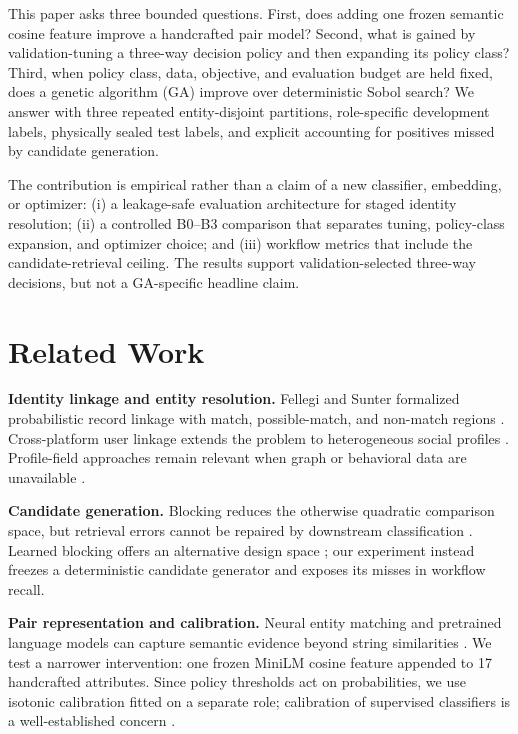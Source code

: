 \documentclass[conference]{IEEEtran}
\begin{document}
This paper asks three bounded questions. First, does adding one frozen semantic cosine feature improve a handcrafted pair model? Second, what is gained by validation-tuning a three-way decision policy and then expanding its policy class? Third, when policy class, data, objective, and evaluation budget are held fixed, does a genetic algorithm (GA) improve over deterministic Sobol search? We answer with three repeated entity-disjoint partitions, role-specific development labels, physically sealed test labels, and explicit accounting for positives missed by candidate generation.

The contribution is empirical rather than a claim of a new classifier, embedding, or optimizer: (i) a leakage-safe evaluation architecture for staged identity resolution; (ii) a controlled B0--B3 comparison that separates tuning, policy-class expansion, and optimizer choice; and (iii) workflow metrics that include the candidate-retrieval ceiling. The results support validation-selected three-way decisions, but not a GA-specific headline claim.

\section{Related Work}
\textbf{Identity linkage and entity resolution.} Fellegi and Sunter formalized probabilistic record linkage with match, possible-match, and non-match regions \cite{fellegi1969theory}. Cross-platform user linkage extends the problem to heterogeneous social profiles \cite{shu2017uilreview,linkSocial2018}. Profile-field approaches remain relevant when graph or behavioral data are unavailable \cite{yao2023profile}.

\textbf{Candidate generation.} Blocking reduces the otherwise quadratic comparison space, but retrieval errors cannot be repaired by downstream classification \cite{papadakis2021blocking,li2020blocking}. Learned blocking offers an alternative design space \cite{thirumuruganathan2021deepblocker}; our experiment instead freezes a deterministic candidate generator and exposes its misses in workflow recall.

\textbf{Pair representation and calibration.} Neural entity matching and pretrained language models can capture semantic evidence beyond string similarities \cite{barlaug2021survey,li2020ditto}. We test a narrower intervention: one frozen MiniLM cosine feature appended to 17 handcrafted attributes. Since policy thresholds act on probabilities, we use isotonic calibration fitted on a separate role; calibration of supervised classifiers is a well-established concern \cite{niculescu2005calibration}.
\end{document}
